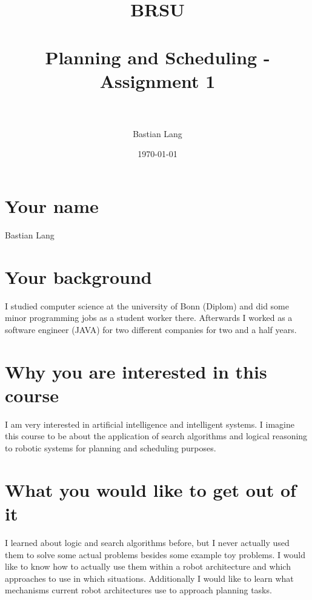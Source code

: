 \documentclass[paper=a4, fontsize=11pt]{scrartcl} %
\title{	
\normalfont \normalsize 
\textsc{BRSU} \\ [25pt] %
\horrule{0.5pt} \\[0.4cm] %
\huge Planning and Scheduling - Assignment 1 \\ %
\horrule{2pt} \\[0.5cm] %
}
\author{Bastian Lang} %
\date{\normalsize\today} %
\numberwithin{equation}{section} %
\numberwithin{figure}{section} %
\numberwithin{table}{section} %
\begin{document}
\maketitle %

\section{Your name}
Bastian Lang

\section{Your background}
I studied computer science at the university of Bonn (Diplom) and did some minor programming jobs as a student worker there. Afterwards I worked as a software engineer (JAVA) for two different companies for two and a half years.

\section{Why you are interested in this course}
I am very interested in artificial intelligence and intelligent systems. I imagine this course to be about the application of search algorithms and logical reasoning to robotic systems for planning and scheduling purposes.

\section{What you would like to get out of it}
I learned about logic and search algorithms before, but I never actually used them to solve some actual problems besides some example toy problems. I would like to know how to actually use them within a robot architecture and which approaches to use in which situations. Additionally I would like to learn what mechanisms current robot architectures use to approach planning tasks.
\end{document}
